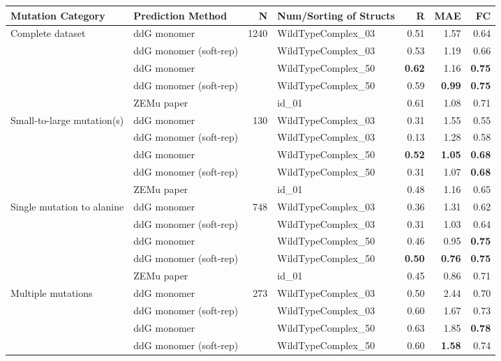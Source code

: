 \begin{table}
  \begin{tabular}{llrlrrr}
\toprule
Mutation Category &       Prediction Method &     N & Num/Sorting of Structs &    R &  MAE &   FC \\
\midrule
 \multirow{ 5}{*}{Complete dataset} & ddG monomer & \multirow{ 5}{*}{1240} & WildTypeComplex\_03 & 0.51 & 1.57 & 0.64  \\
 & ddG monomer (soft-rep) & & WildTypeComplex\_03 & 0.53 & 1.19 & 0.66  \\
 & ddG monomer & & WildTypeComplex\_50 & \textbf{0.62} & 1.16 & \textbf{0.75}  \\
 & ddG monomer (soft-rep) & & WildTypeComplex\_50 & 0.59 & \textbf{0.99} & \textbf{0.75}  \\
 & ZEMu paper & & id\_01 & 0.61 & 1.08 & 0.71  \\
\hline
 \multirow{ 5}{*}{Small-to-large mutation(s)} & ddG monomer & \multirow{ 5}{*}{130} & WildTypeComplex\_03 & 0.31 & 1.55 & 0.55  \\
 & ddG monomer (soft-rep) & & WildTypeComplex\_03 & 0.13 & 1.28 & 0.58  \\
 & ddG monomer & & WildTypeComplex\_50 & \textbf{0.52} & \textbf{1.05} & \textbf{0.68}  \\
 & ddG monomer (soft-rep) & & WildTypeComplex\_50 & 0.31 & 1.07 & \textbf{0.68}  \\
 & ZEMu paper & & id\_01 & 0.48 & 1.16 & 0.65  \\
\hline
 \multirow{ 5}{*}{Single mutation to alanine} & ddG monomer & \multirow{ 5}{*}{748} & WildTypeComplex\_03 & 0.36 & 1.31 & 0.62  \\
 & ddG monomer (soft-rep) & & WildTypeComplex\_03 & 0.31 & 1.03 & 0.64  \\
 & ddG monomer & & WildTypeComplex\_50 & 0.46 & 0.95 & \textbf{0.75}  \\
 & ddG monomer (soft-rep) & & WildTypeComplex\_50 & \textbf{0.50} & \textbf{0.76} & \textbf{0.75}  \\
 & ZEMu paper & & id\_01 & 0.45 & 0.86 & 0.71  \\
\hline
 \multirow{ 5}{*}{Multiple mutations} & ddG monomer & \multirow{ 5}{*}{273} & WildTypeComplex\_03 & 0.50 & 2.44 & 0.70  \\
 & ddG monomer (soft-rep) & & WildTypeComplex\_03 & 0.60 & 1.67 & 0.73  \\
 & ddG monomer & & WildTypeComplex\_50 & 0.63 & 1.85 & \textbf{0.78}  \\
 & ddG monomer (soft-rep) & & WildTypeComplex\_50 & 0.60 & \textbf{1.58} & 0.74  \\

\end{tabular}
\end{table}
